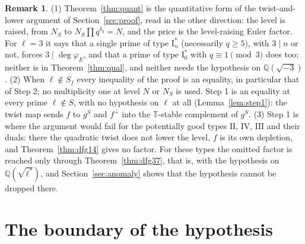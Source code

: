 \documentclass[11pt]{amsart}
\theoremstyle{definition}
\newtheorem{remark}[theorem]{Remark}
\newcommand{\Q}{\mathbb{Q}}
\newcommand{\T}{\mathbb{T}}
\newcommand{\degphi}{\deg\varphi_E}
\begin{document}
\begin{remark}\label{rem:afterquant}
(1) Theorem~\ref{thm:quant} is the quantitative form of the twist-and-lower argument of Section~\ref{sec:proof}, read in the other direction: the level is raised, from $N_S$ to $N_S\prod q^{\delta_q}=N$, and the price is the level-raising Euler factor. For $\ell=3$ it says that a single prime of type $\mathrm{I}_n^*$ (necessarily $q\ge5$), with $3\mid n$ or not, forces $3\mid\degphi$, and that a prime of type $\mathrm{I}_0^*$ with $q\equiv1\pmod3$ does too; neither is in Theorem~\ref{thm:qual}, and neither needs the hypothesis on $\Q(\sqrt{-3})$. (2) When $\ell\notin S_f$ every inequality of the proof is an equality, in particular that of Step 2; no multiplicity one at level $N$ or $N_S$ is used. Step 1 is an equality at every prime $\ell\notin S$, with no hypothesis on $\ell$ at all (Lemma~\ref{lem:step1}): the twist map sends $f$ to $g^S$ and $f^\perp$ into the $\T$-stable complement of $g^S$. (3) Step 1 is where the argument would fail for the potentially good types $\mathrm{II}$, $\mathrm{IV}$, $\mathrm{III}$ and their duals: there the quadratic twist does not lower the level, $f$ is its own depletion, and Theorem~\ref{thm:dfg14} gives no factor. For these types the omitted factor is reached only through Theorem~\ref{thm:dfg37}, that is, with the hypothesis on $\Q(\sqrt{\ell^*})$, and Section~\ref{sec:anomaly} shows that the hypothesis cannot be dropped there.
\end{remark}

\section{The boundary of the hypothesis}\label{sec:boundary}
\end{document}
